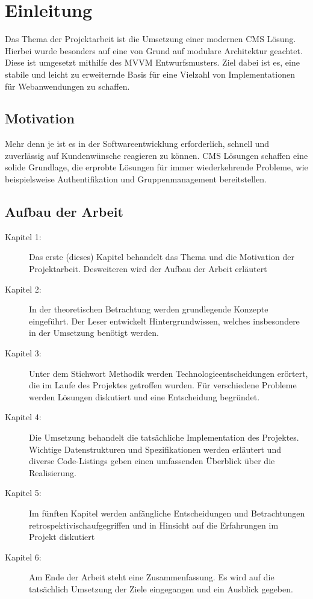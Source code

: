 \chapter{Einleitung}
Das Thema der Projektarbeit ist die Umsetzung einer modernen \ac{CMS} Lösung. Hierbei wurde besonders auf eine von Grund auf modulare Architektur geachtet. Diese ist umgesetzt mithilfe des \ac{MVVM} Entwurfsmusters. Ziel dabei ist es, eine stabile und leicht zu erweiternde Basis für eine Vielzahl von Implementationen für Webanwendungen zu schaffen.

\section{Motivation}
Mehr denn je ist es in der Softwareentwicklung erforderlich, schnell und zuverlässig auf Kundenwünsche reagieren zu können. \acs{CMS} Lösungen schaffen eine solide Grundlage, die erprobte Lösungen für immer wiederkehrende Probleme, wie beispielsweise Authentifikation und Gruppenmanagement bereitstellen.

\section{Aufbau der Arbeit}
\begin{description}
\item[Kapitel 1:]{Das erste (dieses) Kapitel behandelt das Thema und die Motivation der Projektarbeit. Desweiteren wird der Aufbau der Arbeit erläutert}
\item[Kapitel 2:]{In der theoretischen Betrachtung werden grundlegende Konzepte eingeführt. Der Leser entwickelt Hintergrundwissen, welches insbesondere in der Umsetzung benötigt werden.}
\item[Kapitel 3:]{Unter dem Stichwort Methodik werden Technologieentscheidungen erörtert, die im Laufe des Projektes getroffen wurden. Für verschiedene Probleme werden Lösungen diskutiert und eine Entscheidung begründet.}
\item[Kapitel 4:]{Die Umsetzung behandelt die tatsächliche Implementation des Projektes. Wichtige Datenstrukturen und Spezifikationen werden erläutert und diverse Code-Listings geben einen umfassenden Überblick über die Realisierung.}
\item[Kapitel 5:]{Im fünften Kapitel werden anfängliche Entscheidungen und Betrachtungen retrospektivischaufgegriffen und in Hinsicht auf die Erfahrungen im Projekt diskutiert}
\item[Kapitel 6:]{Am Ende der Arbeit steht eine Zusammenfassung. Es wird auf die tatsächlich Umsetzung der Ziele eingegangen und ein Ausblick gegeben.}
\end{description}
